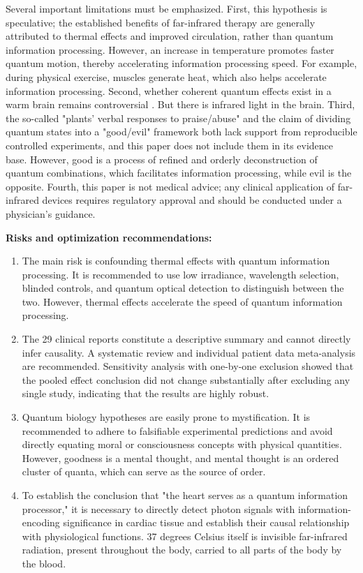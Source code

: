 \documentclass[11pt,a4paper]{article}
\begin{document}
Several important limitations must be emphasized. First, this hypothesis is speculative; the established benefits of far-infrared therapy are generally attributed to thermal effects and improved circulation, rather than quantum information processing. However, an increase in temperature promotes faster quantum motion, thereby accelerating information processing speed. For example, during physical exercise, muscles generate heat, which also helps accelerate information processing. Second, whether coherent quantum effects exist in a warm brain remains controversial \cite{hameroff2014}. But there is infrared light in the brain.  Third, the so-called "plants' verbal responses to praise/abuse" and the claim of dividing quantum states into a "good/evil" framework both lack support from reproducible controlled experiments, and this paper does not include them in its evidence base. However, good is a process of refined and orderly deconstruction of quantum combinations, which facilitates information processing, while evil is the opposite. Fourth, this paper is not medical advice; any clinical application of far-infrared devices requires regulatory approval and should be conducted under a physician's guidance.

\textbf{Risks and optimization recommendations:}
\begin{enumerate}
    \item The main risk is confounding thermal effects with quantum information processing. It is recommended to use low irradiance, wavelength selection, blinded controls, and quantum optical detection to distinguish between the two. However, thermal effects accelerate the speed of quantum information processing.
    \item The 29 clinical reports constitute a descriptive summary and cannot directly infer causality. A systematic review and individual patient data meta-analysis are recommended. Sensitivity analysis with one-by-one exclusion showed that the pooled effect conclusion did not change substantially after excluding any single study, indicating that the results are highly robust.
    \item  Quantum biology hypotheses are easily prone to mystification. It is recommended to adhere to falsifiable experimental predictions and avoid directly equating moral or consciousness concepts with physical quantities. However, goodness is a mental thought, and mental thought is an ordered cluster of quanta, which can serve as the source of order.
    \item To establish the conclusion that "the heart serves as a quantum information processor," it is necessary to directly detect photon signals with information-encoding significance in cardiac tissue and establish their causal relationship with physiological functions. 37 degrees Celsius itself is invisible far-infrared radiation, present throughout the body, carried to all parts of the body by the blood.
\end{enumerate}
\end{document}
